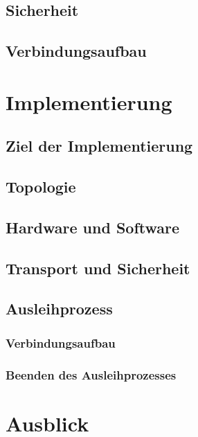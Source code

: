 \documentclass[doktyp=barbeit]{TUBAFarbeiten}
\begin{document}
	\subsection{Sicherheit}
		\label{sec: infra sicherheit}
		

	\subsection{Verbindungsaufbau}
		\label{sec: infra verbindungsaufbau}
		

\newpage
\section{Implementierung}

	\subsection{Ziel der Implementierung}

	\subsection{Topologie}

	\subsection{Hardware und Software}

	\subsection{Transport und Sicherheit}

	\subsection{Ausleihprozess}

		\subsubsection{Verbindungsaufbau}

		\subsubsection{Beenden des Ausleihprozesses}

\newpage
\section{Ausblick}
	
\end{document}
